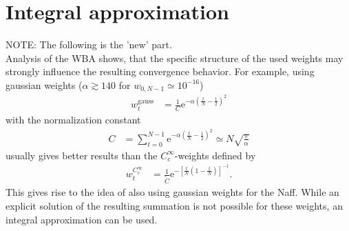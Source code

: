 \documentclass[english, parskip=full]{scrartcl}
\newcommand{\kla}{}
\newcommand{\klam}{}
\newcommand{\tecxt}{}
\newcommand{\e}{\text{e}}
\begin{document}
\section{Integral approximation}
NOTE: The following is the 'new' part.
\\
Analysis of the WBA shows, that the specific structure of the used weights may strongly influence the resulting convergence behavior.
For example, using gaussian weights ($\alpha\gtrsim 140$ for $w_{0,N-1}\simeq 10^{-16}$)
\begin{align}
w^\tecxt\text{gauss}_t&=\frac{1}{C}\e^{-\alpha \kla\left( {\frac{t}{N}-\frac{1}{2}} \right)^2}
\end{align}
with the normalization constant
\begin{align}
C&=\sum_{t=0}^{N-1}\e^{-\alpha \kla\left( {\frac{t}{N}-\frac{1}{2}} \right)^2}\simeq N\sqrt{\frac{\pi}{\alpha}}
\end{align}
usually gives better results than the $C_c^\infty$-weights defined by
\begin{align}
w^{C_c^\infty}_t&=\frac{1}{\tilde{C}}\e^{-\klam\left[ {\frac{t}{N}\kla\left( {1-\frac{t}{N}} \right)} \right]^{-1}}.
\end{align}
This gives rise to the idea of also using gaussian weights for the Naff.
While an explicit solution of the resulting summation is not possible for these weights, an integral approximation can be used.
\end{document}
